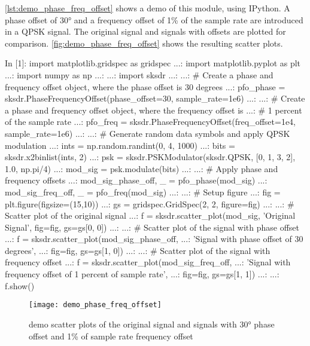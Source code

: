 \autoref{lst:demo_phase_freq_offset} shows a demo of this module, using IPython. A phase offset of 30° and a frequency offset of 1\% of the sample rate are introduced in a QPSK signal. The original signal and signals with offsets are plotted for comparison. \autoref{fig:demo_phase_freq_offset} shows the resulting scatter plots.

\begin{python}[label={lst:demo_phase_freq_offset},caption={\code{PhaseFrequencyOffset} demo}]
  In [1]: import matplotlib.gridspec as gridspec
  ...: import matplotlib.pyplot as plt
  ...: import numpy as np
  ...:
  ...: import sksdr
  ...:
  ...: # Create a phase and frequency offset object, where the phase offset is 30 degrees
  ...: pfo_phase = sksdr.PhaseFrequencyOffset(phase_offset=30, sample_rate=1e6)
  ...:
  ...: # Create a phase and frequency offset object, where the frequency offset is
  ...: # 1 percent of the sample rate
  ...: pfo_freq = sksdr.PhaseFrequencyOffset(freq_offset=1e4, sample_rate=1e6)
  ...:
  ...: # Generate random data symbols and apply QPSK modulation
  ...: ints = np.random.randint(0, 4, 1000)
  ...: bits = sksdr.x2binlist(ints, 2)
  ...: psk = sksdr.PSKModulator(sksdr.QPSK, [0, 1, 3, 2], 1.0, np.pi/4)
  ...: mod_sig = psk.modulate(bits)
  ...:
  ...: # Apply phase and frequency offsets
  ...: mod_sig_phase_off, _ = pfo_phase(mod_sig)
  ...: mod_sig_freq_off, _ = pfo_freq(mod_sig)
  ...:
  ...: # Setup figure
  ...: fig = plt.figure(figsize=(15,10))
  ...: gs = gridspec.GridSpec(2, 2, figure=fig)
  ...:
  ...: # Scatter plot of the original signal
  ...: f = sksdr.scatter_plot(mod_sig, 'Original Signal', fig=fig, gs=gs[0, 0])
  ...:
  ...: # Scatter plot of the signal with phase offset
  ...: f = sksdr.scatter_plot(mod_sig_phase_off,
  ...:                        'Signal with phase offset of 30 degrees',
  ...:                        fig=fig, gs=gs[1, 0])
  ...:
  ...: # Scatter plot of the signal with frequency offset
  ...: f = sksdr.scatter_plot(mod_sig_freq_off,
  ...:                       'Signal with frequency offset of 1 percent of sample rate',
  ...:                       fig=fig, gs=gs[1, 1])
  ...:
  ...: f.show()
\end{python}

\begin{figure}[H]
  \centering
  \texttt{[image: demo\_phase\_freq\_offset]}
  \caption{ demo scatter plots of the original signal and signals with 30° phase offset and 1\% of sample rate frequency offset}
  \label{fig:demo_phase_freq_offset}
\end{figure}

